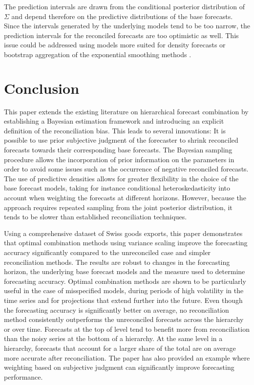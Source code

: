 \documentclass[a4paper,fleqn,11pt]{article}
\begin{document}
The prediction intervals are drawn from the conditional posterior distribution of $\Sigma$ and depend therefore on the predictive distributions of the base forecasts. Since the intervals generated by the underlying models tend to be too narrow, the prediction intervals for the reconciled forecasts are too optimistic as well. This issue could be addressed using models more suited for density forecasts or bootstrap aggregation of the exponential smoothing methods \citep{Bergmeir2016}.\\

\section{Conclusion}\label{sec:conc}
This paper extends the existing literature on hierarchical forecast combination by establishing a Bayesian estimation framework and introducing an explicit definition of the reconciliation bias. This leads to several innovations: It is possible to use prior subjective judgment of the forecaster to shrink reconciled forecasts towards their corresponding base forecasts. The Bayesian sampling procedure allows the incorporation of prior information on the parameters in order to avoid some issues such as the occurrence of negative reconciled forecasts. The use of predictive densities allows for greater flexibility in the choice of the base forecast models, taking for instance conditional heteroskedasticity into account when weighting the forecasts at different horizons. However, because the approach requires repeated sampling from the joint posterior distribution, it tends to be slower than established reconciliation techniques.

Using a comprehensive dataset of Swiss goods exports, this paper demonstrates that optimal combination methods using variance scaling improve the forecasting accuracy significantly compared to the unreconciled case and simpler reconciliation methods. The results are robust to changes in the forecasting horizon, the underlying base forecast models and the measure used to determine forecasting accuracy. Optimal combination methods are shown to be particularly useful in the case of misspecified models, during periods of high volatility in the time series and for projections that extend further into the future. Even though the forecasting accuracy is significantly better on average, no reconciliation method consistently outperforms the unreconciled forecasts across the hierarchy or over time. Forecasts at the top of level tend to benefit more from reconciliation than the noisy series at the bottom of a hierarchy. At the same level in a hierarchy, forecasts that account for a larger share of the total are on average more accurate after reconciliation. The paper has also provided an example where weighting based on subjective judgment can significantly improve forecasting performance. 



\clearpage

\setcounter{page}{2}



\clearpage



\end{document}
